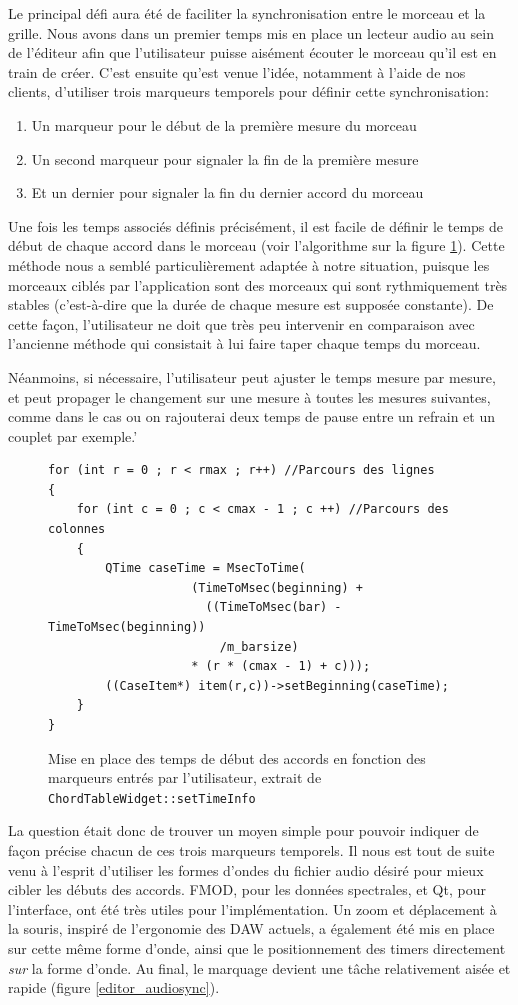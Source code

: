 Le principal défi aura été de faciliter la synchronisation entre le morceau et la grille. Nous avons dans un premier temps mis en place un lecteur audio au sein de l'éditeur afin que l'utilisateur puisse aisément écouter le morceau qu'il est en train de créer. C'est ensuite qu'est venue l'idée, notamment à l'aide de nos clients, d'utiliser trois marqueurs temporels pour définir cette synchronisation:
\begin{enumerate}
 \item Un marqueur pour le début de la première mesure du morceau
 \item Un second marqueur pour signaler la fin de la première mesure
 \item Et un dernier pour signaler la fin du dernier accord du morceau
\end{enumerate}
Une fois les temps associés définis précisément, il est facile de définir le temps de début de chaque accord dans le morceau (voir l'algorithme sur la figure \ref{editor_time_caseitems}). Cette méthode nous a semblé particulièrement adaptée à notre situation, puisque les morceaux ciblés par l'application sont des morceaux qui sont rythmiquement très stables (c'est-à-dire que la durée de chaque mesure est supposée constante). De cette façon, l'utilisateur ne doit que très peu intervenir en comparaison avec l'ancienne méthode qui consistait à lui faire taper chaque temps du morceau.

Néanmoins, si nécessaire, l'utilisateur peut ajuster le temps mesure par mesure, et peut propager le changement sur une mesure à toutes
les mesures suivantes, comme dans le cas ou on rajouterai deux temps de pause entre un refrain et un couplet par exemple.'

\begin{figure}[H]
\begin{lstlisting}
for (int r = 0 ; r < rmax ; r++) //Parcours des lignes
{
	for (int c = 0 ; c < cmax - 1 ; c ++) //Parcours des colonnes
	{
		QTime caseTime = MsecToTime(
				    (TimeToMsec(beginning) +
				      ((TimeToMsec(bar) - TimeToMsec(beginning))
				        /m_barsize)
				    * (r * (cmax - 1) + c)));
		((CaseItem*) item(r,c))->setBeginning(caseTime);
	}
}
\end{lstlisting}
\caption{Mise en place des temps de début des accords en fonction des marqueurs entrés par l'utilisateur, extrait de \texttt{ChordTableWidget::setTimeInfo}}
\label{editor_time_caseitems}
\end{figure}

La question était donc de trouver un moyen simple pour pouvoir indiquer de façon précise chacun de ces trois marqueurs temporels. Il nous est tout de suite venu à l'esprit d'utiliser les formes d'ondes du fichier audio désiré pour mieux cibler les débuts des accords. FMOD, pour les données spectrales, et Qt, pour l'interface, ont été très utiles pour l'implémentation. Un zoom et déplacement à la souris, inspiré de l'ergonomie des \ac{DAW} actuels, a également été mis en place sur cette même forme d'onde, ainsi que le positionnement des timers directement \textit{sur} la forme d'onde. Au final, le marquage devient une tâche relativement aisée et rapide (figure \ref{editor_audiosync}).

